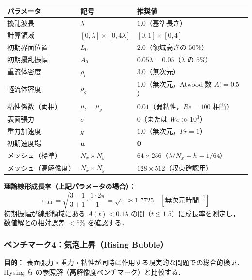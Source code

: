 \begin{tcolorbox}[defbox, title={Rayleigh--Taylor ベンチマーク：具体的パラメータ（推奨設定）}]
\begin{center}
\renewcommand{\arraystretch}{1.3}
\begin{tabular}{lll}
\hline
パラメータ & 記号 & 推奨値 \\
\hline
擾乱波長 & $\lambda$ & $1.0$（基準長さ） \\
計算領域 & $[0,\lambda]\times[0,4\lambda]$ & $[0,1]\times[0,4]$ \\
初期界面位置 & $L_0$ & $2.0$（領域高さの $50\%$） \\
初期擾乱振幅 & $A_0$ & $0.05\lambda = 0.05$（$\lambda$ の $5\%$） \\
重流体密度 & $\rho_l$ & $3.0$（無次元） \\
軽流体密度 & $\rho_g$ & $1.0$（無次元，Atwood 数 $At = 0.5$） \\
粘性係数（両相） & $\mu_l = \mu_g$ & $0.01$（弱粘性，$Re = 100$ 相当） \\
表面張力 & $\sigma$ & $0$（または $We \gg 10^3$） \\
重力加速度 & $g$ & $1.0$（無次元，$Fr = 1$） \\
初期速度場 & $\bm{u}$ & $\bm{0}$ \\
メッシュ（標準） & $N_x \times N_y$ & $64 \times 256$（$\lambda / N_x = h = 1/64$） \\
メッシュ（高解像度） & $N_x \times N_y$ & $128 \times 512$（収束確認用） \\
\hline
\end{tabular}
\end{center}

\textbf{理論線形成長率（上記パラメータの場合）：}
\[
  \omega_{\mathrm{RT}} = \sqrt{\frac{3-1}{3+1} \cdot \frac{1 \cdot 2\pi}{1}} = \sqrt{\pi} \approx 1.7725
  \quad [\text{無次元時間}^{-1}]
\]
初期振幅が線形領域にある $A(t) < 0.1\lambda$ の間（$t \lesssim 1.5$）に成長率を測定し，
数値解との相対誤差 $< 5\%$ を確認する．
\end{tcolorbox}

\subsubsection{ベンチマーク4：気泡上昇（Rising Bubble）}
\label{sec:bench_bubble}

\textbf{目的：} 表面張力・重力・粘性が同時に作用する現実的な問題での総合的検証．
Hysing ら \cite{Hysing2009} の参照解（高解像度ベンチマーク）と比較する．

